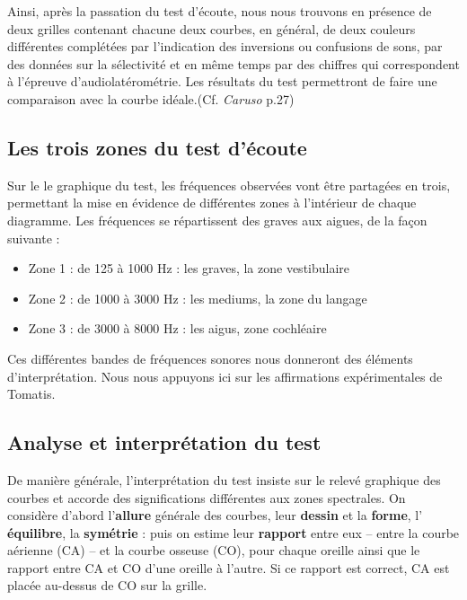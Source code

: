               Ainsi, après la passation du test d\textquoteright écoute, nous nous
trouvons en présence de deux grilles contenant chacune deux courbes,
en général, de deux couleurs différentes complétées par l'indication
des inversions ou confusions de sons, par des données sur la sélectivité
et en même temps par des chiffres qui correspondent à l'épreuve d'audiolatérométrie.
Les résultats du test permettront de faire une comparaison avec la
courbe idéale.(Cf.\textit{ Caruso }p.27)


\subsection{Les trois zones du test d'écoute }
Sur le le graphique du test, les fréquences observées vont être partagées en
trois, permettant la mise en évidence de différentes zones à l\textquoteright intérieur
de chaque diagramme. Les fréquences se répartissent des 
graves aux aigues, de la façon suivante :
\begin{itemize}
\item Zone 1 : de 125 à 1000 Hz : les graves, la zone vestibulaire
\item Zone 2 : de 1000 à 3000 Hz : les mediums, la zone du langage
\item Zone 3 : de 3000 à 8000 Hz : les aigus, zone cochléaire
\end{itemize}
Ces différentes bandes de fréquences sonores nous donneront des éléments
d'interprétation.
Nous nous appuyons ici sur les affirmations expérimentales de Tomatis.

\subsection {Analyse et interprétation du test}


De manière générale, l'interprétation du test insiste sur le relevé graphique
des
courbes et accorde des
significations différentes aux zones spectrales.
On considère d'abord l'\textbf{allure }générale des courbes, leur
\textbf{dessin} et la \textbf{forme}, l' \textbf{équilibre}, la \textbf{symétrie}  : 
puis on estime
leur\textbf{ rapport} entre eux -- entre la courbe aérienne (CA) -- et la courbe osseuse (CO),
pour chaque oreille ainsi que le rapport entre CA et CO d\textquoteright une
oreille à l'autre. Si ce rapport est correct, CA est placée au-dessus
de CO sur la grille.

